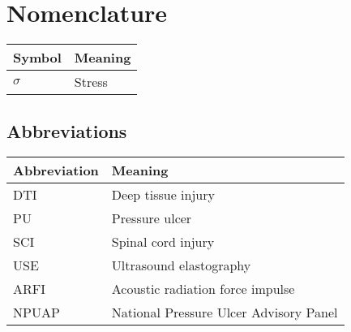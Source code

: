 \chapter*{Nomenclature}
	\begin{longtable}[l]{ll}
		Symbol & Meaning \\
		\hline \endhead
		$\sigma$ & Stress \\
	\end{longtable}

	\section*{Abbreviations}
		\begin{longtable}[l]{ll}
			Abbreviation & Meaning \\
			\hline \endhead
			DTI & Deep tissue injury \\
			PU & Pressure ulcer \\
			SCI & Spinal cord injury \\
			USE & Ultrasound elastography \\
			ARFI & Acoustic radiation force impulse \\
			NPUAP & National Pressure Ulcer Advisory Panel
		\end{longtable}